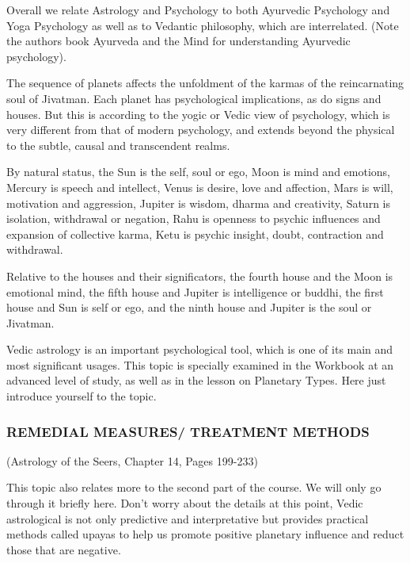  

Overall we relate Astrology and Psychology to both Ayurvedic Psychology and Yoga Psychology as well as to Vedantic philosophy, which are interrelated. (Note the authors book Ayurveda and the Mind for understanding Ayurvedic psychology).

The sequence of planets affects  the unfoldment of the karmas of the reincarnating soul of Jivatman. Each planet has psychological implications, as do signs and houses. But this is according to the yogic or Vedic view of psychology, which is very different from that of modern psychology, and extends beyond the physical to the subtle, causal and transcendent realms.

 

By natural status, the Sun is the self, soul or ego, Moon is mind and emotions, Mercury is speech and intellect, Venus is desire, love and affection, Mars is will, motivation and aggression, Jupiter is wisdom, dharma and creativity, Saturn is isolation, withdrawal or negation, Rahu is openness to psychic influences and expansion of collective karma, Ketu is psychic insight, doubt, contraction and withdrawal.

Relative to the houses and their significators, the fourth house  and the Moon is emotional mind, the fifth house and Jupiter is intelligence or buddhi, the first house and Sun is self or ego, and the ninth house and Jupiter is the soul or Jivatman.

 

Vedic astrology is an important psychological tool, which is one of its main and most significant usages. This topic is specially  examined in the Workbook at an advanced level of study, as well as in the lesson on Planetary Types. Here just introduce yourself to the topic.

 

\subsubsection{REMEDIAL MEASURES/ TREATMENT METHODS }(Astrology of the Seers, Chapter 14, Pages 199-233)

 

This topic also relates more to the second part of the course. We will only go through it briefly here. Don’t worry about the details at this point, Vedic astrological is not only predictive and interpretative but provides practical methods called upayas to help us promote positive planetary influence and reduct those that are negative.

